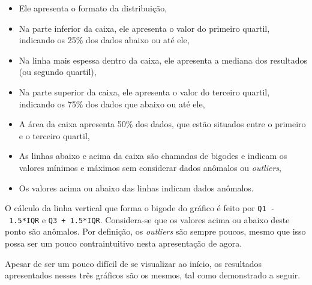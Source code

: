 \documentclass[
]{book}
\providecommand{\tightlist}{%
  \setlength{\itemsep}{0pt}\setlength{\parskip}{0pt}}
\begin{document}
\begin{itemize}
\tightlist
\item
  Ele apresenta o formato da distribuição,\\
\item
  Na parte inferior da caixa, ele apresenta o valor do primeiro quartil, indicando os 25\% dos dados abaixo ou até ele,\\
\item
  Na linha mais espessa dentro da caixa, ele apresenta a mediana dos resultados (ou segundo quartil),\\
\item
  Na parte superior da caixa, ele apresenta o valor do terceiro quartil, indicando os 75\% dos dados que abaixo ou até ele,\\
\item
  A área da caixa apresenta 50\% dos dados, que estão situados entre o primeiro e o terceiro quartil,\\
\item
  As linhas abaixo e acima da caixa são chamadas de bigodes e indicam os valores mínimos e máximos sem considerar dados anômalos ou \emph{outliers},\\
\item
  Os valores acima ou abaixo das linhas indicam dados anômalos.
\end{itemize}

O cálculo da linha vertical que forma o bigode do gráfico é feito por \texttt{Q1\ -\ 1.5*IQR} e \texttt{Q3\ +\ 1.5*IQR}. Considera-se que os valores acima ou abaixo deste ponto são anômalos. Por definição, os \emph{outliers} são sempre poucos, mesmo que isso possa ser um pouco contraintuitivo nesta apresentação de agora.

Apesar de ser um pouco difícil de se visualizar ao início, os resultados apresentados nesses três gráficos são os mesmos, tal como demonstrado a seguir.
\end{document}
